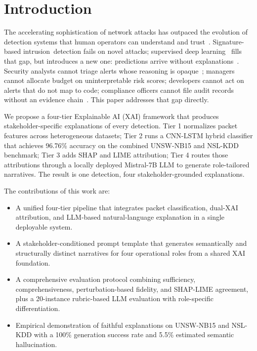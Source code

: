 \documentclass[sensors,apajournal,article,submit,moreauthors]{Definitions/mdpi}
\begin{document}
\section{Introduction}

The accelerating sophistication of network attacks has outpaced the evolution of detection systems that human operators can understand and trust~\citep{apruzzese2020deep,khraisat2019survey,vinayakumar2019deep}. Signature-based \mbox{intrusion detection} fails on novel attacks; supervised deep learning~\citep{vinayakumar2019deep,ferrag2020deep} fills that gap, but introduces a new one: predictions arrive without explanations~\citep{adadi2018peeking,bhatt2020explainable,goodfellow2014explaining}. Security analysts cannot triage alerts whose reasoning is opaque~\citep{apruzzese2020deep}; managers cannot allocate budget on uninterpretable risk scores; developers cannot act on alerts that do not map to code; compliance officers cannot file audit records without an evidence chain~\citep{ferrag2020deep}. This paper addresses that gap directly.

We propose a four-tier Explainable AI (XAI) framework that produces \mbox{stakeholder-specific} explanations of every detection. Tier 1 normalizes packet features across heterogeneous datasets; Tier 2 runs a CNN-LSTM hybrid classifier that achieves 96.76\% accuracy on the combined UNSW-NB15 and NSL-KDD benchmark; Tier 3 adds SHAP and LIME attribution; Tier 4 routes those attributions through a locally deployed Mistral-7B LLM to generate \mbox{role-tailored} narratives. The result is one detection, four \mbox{stakeholder-grounded} explanations.

The contributions of this work are:
\begin{itemize}
\item A unified four-tier pipeline that integrates packet classification, dual-XAI attribution, and LLM-based natural-language explanation in a single deployable system.
\item A \mbox{stakeholder-conditioned} prompt template that generates semantically and structurally distinct narratives for four operational roles from a shared XAI foundation.
\item A comprehensive evaluation protocol combining sufficiency, comprehensiveness, perturbation-based fidelity, and SHAP-LIME agreement, plus a 20-instance rubric-based LLM evaluation with role-specific differentiation.
\item Empirical demonstration of faithful explanations on UNSW-NB15 and NSL-KDD with a 100\% generation success rate and 5.5\% estimated semantic hallucination.
\end{itemize}
\end{document}
